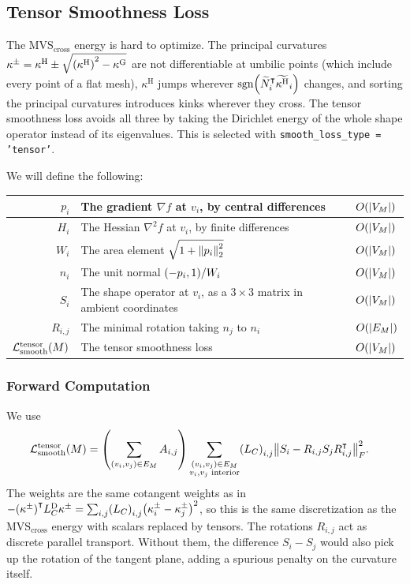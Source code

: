 \subsection{Tensor Smoothness Loss}

The \(\text{MVS}_{\text{cross}}\) energy is hard to optimize. The principal curvatures \(\kappa^\pm = \kappa^\text{H} \pm \sqrt{\pof{\kappa^\text{H}}^2 - \kappa^\text{G}}\) are not differentiable at umbilic points (which include every point of a flat mesh), \(\kappa^\text{H}\) jumps wherever \(\sgn\pof{\widetilde{N}_i^\intercal\widetilde{\kappa^\text{H}}_i}\) changes, and sorting the principal curvatures introduces kinks wherever they cross. The tensor smoothness loss avoids all three by taking the Dirichlet energy of the whole shape operator instead of its eigenvalues. This is selected with \texttt{smooth\_loss\_type = 'tensor'}.

We will define the following: \begin{center}\begin{tabular}{r|l|l}
	\(p_i\) & The gradient \(\nabla f\) at \(v_i\), by central differences & \(O\pof{\abs{V_M}}\) \\ \hline
	\(H_i\) & The Hessian \(\nabla^2 f\) at \(v_i\), by finite differences & \(O\pof{\abs{V_M}}\) \\ \hline
	\(W_i\) & The area element \(\sqrt{1 + \norm{p_i}_2^2}\) & \(O\pof{\abs{V_M}}\) \\ \hline
	\(n_i\) & The unit normal \(\pof{-p_i, 1} / W_i\) & \(O\pof{\abs{V_M}}\) \\ \hline
	\(S_i\) & The shape operator at \(v_i\), as a \(3 \times 3\) matrix in ambient coordinates & \(O\pof{\abs{V_M}}\) \\ \hline
	\(R_{i, j}\) & The minimal rotation taking \(n_j\) to \(n_i\) & \(O\pof{\abs{E_M}}\) \\ \hline
	\(\mathcal{L}_{\mathrm{smooth}}^{\text{tensor}}\pof{M}\) & The tensor smoothness loss & \(O\pof{\abs{V_M}}\)
\end{tabular}\end{center}

\subsubsection{Forward Computation}
We use \begin{align*}
	\mathcal{L}_{\mathrm{smooth}}^{\text{tensor}}\pof{M} &= \pof{\sum_{\pof{v_i, v_j} \in E_M} A_{i, j}} \sum_{\substack{\pof{v_i, v_j} \in E_M \\ v_i, v_j \text{ interior}}} \pof{L_C}_{i, j} \norm{S_i - R_{i, j} S_j R_{i, j}^\intercal}_F^2.
\end{align*}
The weights are the same cotangent weights as in \(-\pof{\kappa^\pm}^\intercal L_C^{\text{D}} \kappa^\pm = \sum_{i, j} \pof{L_C}_{i, j} \pof{\kappa^\pm_i - \kappa^\pm_j}^2\), so this is the same discretization as the \(\text{MVS}_{\text{cross}}\) energy with scalars replaced by tensors. The rotations \(R_{i, j}\) act as discrete parallel transport. Without them, the difference \(S_i - S_j\) would also pick up the rotation of the tangent plane, adding a spurious penalty on the curvature itself.

